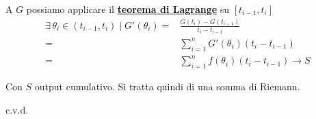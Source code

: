 \documentclass[../dimostrazioni]{subfiles}
\begin{document}
                A \(G\) possiamo applicare il \textbf{\hyperref[teoLagrange]{teorema di Lagrange}} su \([t_{i-1}, t_i]\)
                \begin{align*}
                    \exists \, \theta_i \in (t_{i-1}, t_i) \mid G'(\theta_i) =& \frac{G(t_i) - G(t_{i-1})}{t_i - t_{i-1}} \\
                    =& \sum_{i=1}^{n} G'(\theta_i)(t_i - t_{i-1}) \\
                    =& \sum_{i=1}^{n} f(\theta_i)(t_i - t_{i-1}) \longrightarrow S
                \end{align*}

                Con \(S\) output cumulativo. Si tratta quindi di una somma di Riemann.

                \medskip
                
                c.v.d.
    
\end{document}
